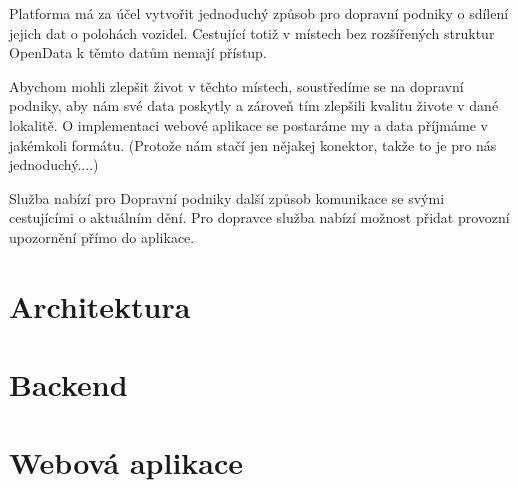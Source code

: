 Platforma má za účel vytvořit jednoduchý způsob pro dopravní podniky o sdílení jejich dat o polohách vozidel.
Cestující totiž v místech bez rozšířených struktur OpenData k těmto datům nemají přístup.

Abychom mohli zlepšit život v těchto místech, soustředíme se na dopravní podniky, aby nám své data poskytly a zároveň tím zlepšili kvalitu živote v dané lokalitě.
O implementaci webové aplikace se postaráme my a data příjmáme v jakémkoli formátu. (Protože nám stačí jen nějakej konektor, takže to je pro nás jednoduchý....)

Služba nabízí pro Dopravní podniky další způsob komunikace se svými cestujícími o aktuálním dění. Pro dopravce služba nabízí možnost přidat provozní upozornění přímo do aplikace.

\section{Architektura}

\section{Backend}

\section{Webová aplikace}
